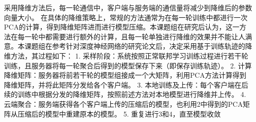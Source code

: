 采用降维方法后，每一轮通信中，客户端与服务端的通信量将减少到降维后的参数向量大小。
在具体的降维策略上，常规的方法通常为在每一轮训练中都进行一次PCA的计算，得到降维矩阵进而进行模型压缩。本课题组在研究后认为，这一方法在每一轮中都需要进行额外的计算，且每一轮单独进行降维的效果并不能让人满意。本课题组在参考针对深度神经网络的研究论文后，决定采用基于训练轨迹的降维方法，其过程如下：
1. 采样阶段：系统按照正常联邦学习训练过程进行若干轮训练，且服务器将每一轮聚合后得到的模型保存下来（即保存训练轨迹）。
2. 计算降维矩阵：服务器将前若干轮的模型组接成一个大矩阵，利用PCA方法计算得到降维矩阵，并将此矩阵分发给各个客户端。
3. 本地训练及上传：每个客户端在后续的训练中根据分发的降维矩阵，按照前述方法对本地模型进行降维并上传。
4. 云端聚合：服务端获得各个客户端上传的压缩后的模型，也利用2中得到的PCA矩阵从压缩后的模型中重建原本的模型。
5. 重复进行3和4，直至模型收敛

